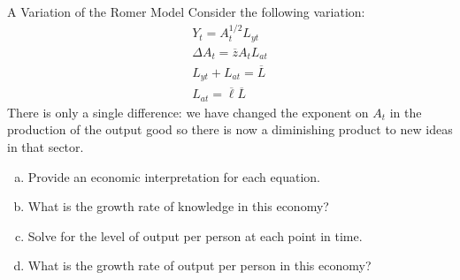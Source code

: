 \documentclass[10pt]{extarticle}
\begin{document}
  \begin{problem}{A Variation of the Romer Model}
    Consider the following variation:
    \begin{align*}
      Y_t = A_t^{1/2}L_{yt}\\
      \Delta A_t = \overline{z}A_tL_{at}\\
      L_{yt} + L_{at} = \overline{L}\\
      L_{at} = \overline{\ell}\overline{L}
    \end{align*}
    There is only a single difference: we have changed the exponent on $A_t$ in the production of the output good so there is now a diminishing product to new ideas in that sector.
    \begin{enumerate}[(a)]
      \item Provide an economic interpretation for each equation.
      \item What is the growth rate of knowledge in this economy?
      \item Solve for the level of output per person at each point in time.
      \item What is the growth rate of output per person in this economy?
    \end{enumerate}
  \end{problem}
\end{document}
